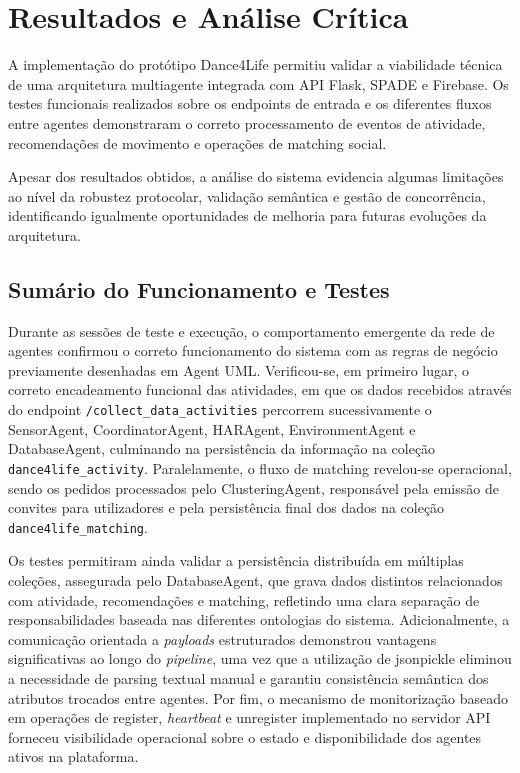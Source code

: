 \documentclass[runningheads]{llncs}
\begin{document}
\section{Resultados e Análise Crítica}
A implementação do protótipo Dance4Life permitiu validar a viabilidade técnica de uma arquitetura multiagente integrada com API Flask, SPADE e Firebase. Os testes funcionais realizados sobre os endpoints de entrada e os diferentes fluxos entre agentes demonstraram o correto processamento de eventos de atividade, recomendações de movimento e operações de matching social. 

Apesar dos resultados obtidos, a análise do sistema evidencia algumas limitações ao nível da robustez protocolar, validação semântica e gestão de concorrência, identificando igualmente oportunidades de melhoria para futuras evoluções da arquitetura. 

\subsection{Sumário do Funcionamento e Testes}
Durante as sessões de teste e execução, o comportamento emergente da rede de agentes confirmou o correto funcionamento do sistema com as regras de negócio previamente desenhadas em Agent UML. Verificou-se, em primeiro lugar, o correto encadeamento funcional das atividades, em que os dados recebidos através do endpoint \texttt{/collect\_data\_activities} percorrem sucessivamente o SensorAgent, CoordinatorAgent, HARAgent, EnvironmentAgent e DatabaseAgent, culminando na persistência da informação na coleção \texttt{dance4life\_activity}. Paralelamente, o fluxo de matching revelou-se operacional, sendo os pedidos processados pelo ClusteringAgent, responsável pela emissão de convites para utilizadores e pela persistência final dos dados na coleção \texttt{dance4life\_matching}. 

Os testes permitiram ainda validar a persistência distribuída em múltiplas coleções, assegurada pelo DatabaseAgent, que grava dados distintos relacionados com atividade, recomendações e matching, refletindo uma clara separação de responsabilidades baseada nas diferentes ontologias do sistema. Adicionalmente, a comunicação orientada a \textit{payloads} estruturados demonstrou vantagens significativas ao longo do \textit{pipeline}, uma vez que a utilização de jsonpickle eliminou a necessidade de parsing textual manual e garantiu consistência semântica dos atributos trocados entre agentes. Por fim, o mecanismo de monitorização baseado em operações de register, \textit{heartbeat} e unregister implementado no servidor API forneceu visibilidade operacional sobre o estado e disponibilidade dos agentes ativos na plataforma. 
\end{document}
